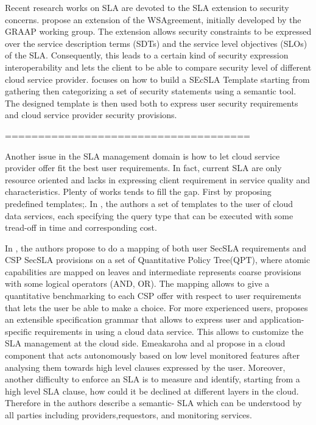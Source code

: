 Recent research works on SLA are devoted to the SLA extension to security concerns. 
\cite{6274042} propose an extension of the WSAgreement, initially developed by the GRAAP
working group. 
The extension allows security constraints to be expressed over the service description
terms (SDTs) and the service level objectives (SLOs) of the SLA. 
Consequently, this leads to a certain kind of security expression interoperability and lets the client to be able to compare security level of different cloud service provider. 
\cite{LunaGarcia:2012:BCS:2381913.2381932} focuses on how to build a SEcSLA Template starting from gathering then categorizing a set of security statements using a semantic tool. 
The designed template is then used both to express user security requirements and cloud service provider security provisions.

=====================================

Another issue in the SLA management domain is how to let cloud service provider offer fit the best user requirements. In fact, current SLA are only resource oriented and lacks in expressing client requirement in service quality and characteristics. Plenty of works tends to fill the gap. First by proposing predefined templates;. In \cite{Ortiz:2013:VPS:2486767.2486772}, the authors
  a set of templates to the user of cloud data services, each specifying the query type that can be executed with some tread-off in time and corresponding cost. 
  
  In \cite{LunaGarcia:2012:BCS:2381913.2381932,}, the authors propose to do a mapping of both user SecSLA requirements and CSP SecSLA provisions on a set of Quantitative Policy Tree(QPT), where atomic capabilities are mapped on leaves and intermediate represents coarse provisions with some logical operators (AND, OR). The mapping allows to give a quantitative benchmarking to each CSP offer with respect to user requirements that lets the user be able to make a choice. For more experienced users, \cite{6313668} proposes an extensible specification grammar that allows to express user and application-specific requirements in using a cloud data service. This allows to customize the SLA management at the cloud side. Emeakaroha and al propose in \cite{5547150}  a cloud component that acts autonomously based on low level monitored features after analysing them towards high level clauses expressed by the user. Moreover, another difficulty to enforce an SLA is to measure and identify, starting from a high level SLA clause, how could it be declined at different layers in the cloud. Therefore in  \cite{Dastjerdi:2012:DOA:2275356.2275360}  the authors describe a semantic- SLA which can be understood by all parties including providers,requestors, and monitoring services. 
  
